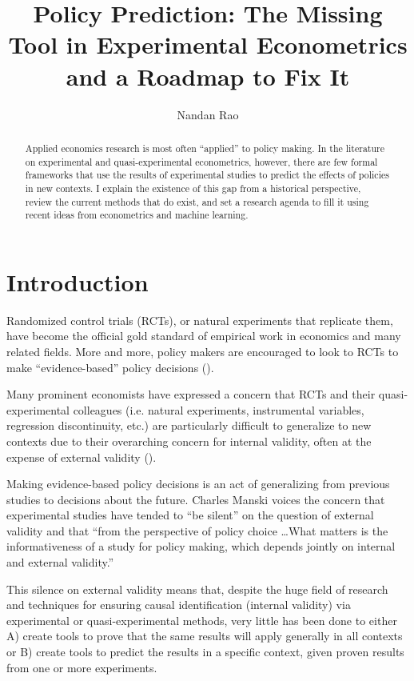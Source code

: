 \documentclass[a4paper,12pt]{article}
\title{ Policy Prediction: The Missing Tool in Experimental Econometrics and a Roadmap to Fix It  }
\author{Nandan Rao}
\begin{document}
\maketitle

\begin{abstract}
Applied economics research is most often ``applied'' to policy making. In the literature on experimental and quasi-experimental econometrics, however, there are few formal frameworks that use the results of experimental studies to predict the effects of policies in new contexts. I explain the existence of this gap from a historical perspective, review the current methods that do exist, and set a research agenda to fill it using recent ideas from econometrics and machine learning.
\end{abstract}


\section{Introduction}

Randomized control trials (RCTs), or natural experiments that replicate them, have become the official gold standard of empirical work in economics and many related fields. More and more, policy makers are encouraged to look to RCTs to make ``evidence-based'' policy decisions (\cite{Manski2013, Cartwright2013}).

Many prominent economists have expressed a concern that RCTs and their quasi-experimental colleagues (i.e. natural experiments, instrumental variables, regression discontinuity, etc.) are particularly difficult to generalize to new contexts due to their overarching concern for internal validity, often at the expense of external validity (\cite{Heckman1995, Heckman2008, Deaton2010, Manski2013, Deaton2018}).

Making evidence-based policy decisions is an act of generalizing from previous studies to decisions about the future. Charles Manski \parencite*{Manski2013} voices the concern that experimental studies have tended to ``be silent'' on the question of external validity and that ``from the perspective of policy choice \ldots What matters is the informativeness of a study for policy making, which depends jointly on internal and external validity.''

This silence on external validity means that, despite the huge field of research and techniques for ensuring causal identification (internal validity) via experimental or quasi-experimental methods, very little has been done to either A) create tools to prove that the same results will apply generally in all contexts or B) create tools to predict the results in a specific context, given proven results from one or more experiments.
\end{document}
